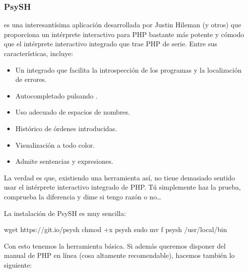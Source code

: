 \documentclass[a4paper,12pt,spanish]{sphinxmanual}
\begin{document}
\subsubsection{PsySH}
\label{\detokenize{php:psysh}}
%
\begin{footnote}[7]\sphinxAtStartFootnote
{}
%
\end{footnote} es una interesantísima aplicación desarrollada por
Justin Hileman (y otros) que proporciona un intérprete interactivo para PHP
bastante más potente y cómodo que el intérprete interactivo integrado que trae
PHP de serie. Entre sus características, incluye:
\begin{itemize}
\item {} 
Un  integrado que facilita la introspección de los programas y la
localización de errores.

\item {} 
Autocompletado pulsando .

\item {} 
Uso adecuado de espacios de nombres.

\item {} 
Histórico de órdenes introducidas.

\item {} 
Visualización a todo color.

\item {} 
Admite sentencias y expresiones.

\end{itemize}

La verdad es que, existiendo una herramienta así, no tiene demasiado sentido
usar el intérprete interactivo integrado de PHP. Tú simplemente haz la prueba,
comprueba la diferencia y dime si tengo razón o no…

La instalación de PsySH es muy sencilla:

%
\begin{sphinxVerbatim}[commandchars=\\\{\}]
 wget https://git.io/psysh
 chmod +x psysh
 sudo mv \PYGZhy{}f psysh /usr/local/bin
\end{sphinxVerbatim}

Con esto tenemos la herramienta básica. Si además queremos disponer del manual de PHP en línea (cosa altamente recomendable), hacemos también lo siguiente:
\end{document}
